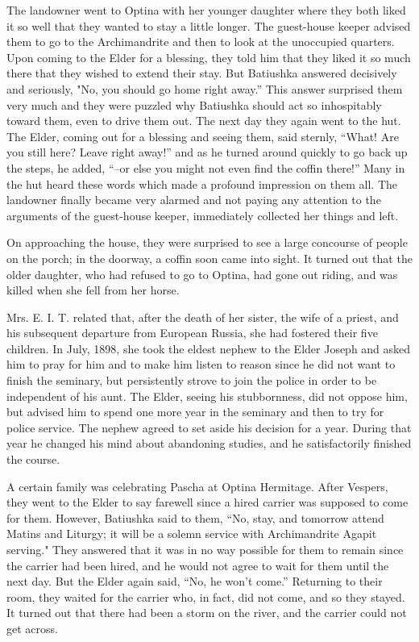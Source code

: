 The landowner went to Optina with her younger daughter where they both liked it so well that they wanted to stay a little longer. The guest-house keeper advised them to go to the Archimandrite and then to look at the unoccupied quarters. Upon coming to the Elder for a blessing, they told him that they liked it so much there that they wished to extend their stay. But Batiushka answered decisively and seriously, "No, you should go home right away.” This answer surprised them very much and they were puzzled why Batiushka should act so inhospitably toward them, even to drive them out. The next day they again went to the hut. The Elder, coming out for a blessing and seeing them, said sternly, “What! Are you still here? Leave right away!” and as he turned around quickly to go back up the steps, he added, “--or else you might not even find the coffin there!” Many in the hut heard these words which made a profound impression on them all. The landowner finally became very alarmed and not paying any attention to the arguments of the guest-house keeper, immediately collected her things and left.

On approaching the house, they were surprised to see a large concourse of people on the porch; in the doorway, a coffin soon came into sight. It turned out that the older daughter, who had refused to go to Optina, had gone out riding, and was killed when she fell from her horse.

Mrs. E. I. T. related that, after the death of her sister, the wife of a priest, and his subsequent departure from European Russia, she had fostered their five children. In July, 1898, she took the eldest nephew to the Elder Joseph and asked him to pray for him and to make him listen to reason since he did not want to finish the seminary, but persistently strove to join the police in order to be independent of his aunt. The Elder, seeing his stubbornness, did not oppose him, but advised him to spend one more year in the seminary and then to try for police service. The nephew agreed to set aside his decision for a year. During that year he changed his mind about abandoning studies, and he satisfactorily finished the course.

A certain family was celebrating Pascha at Optina Hermitage. After Vespers, they went to the Elder to say farewell since a hired carrier was supposed to come for them. However, Batiushka said to them, “No, stay, and tomorrow attend Matins and Liturgy; it will be a solemn service with Archimandrite Agapit serving." They answered that it was in no way possible for them to remain since the carrier had been hired, and he would not agree to wait for them until the next day. But the Elder again said, “No, he won't come.” Returning to their room, they waited for the carrier who, in fact, did not come, and so they stayed. It turned out that there had been a storm on the river, and the carrier could not get across.

